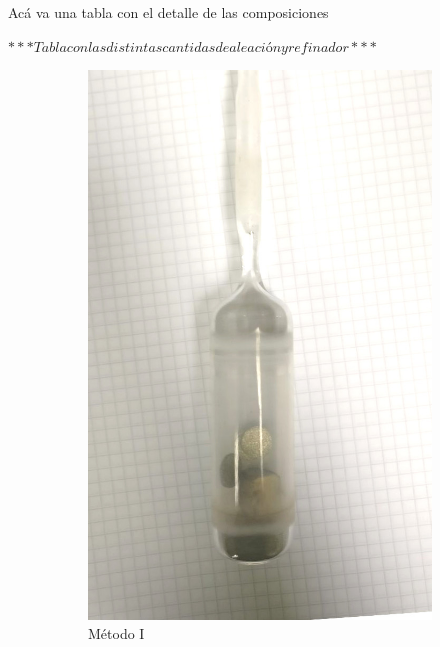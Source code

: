 \documentclass[a4paper,12pt,fleqn,twoside,openany]{book}
\begin{document}
Acá va una tabla con el detalle de las composiciones


$***Tabla con las distintas cantidas de aleación y refinador***$

 \begin{figure}[h]
    \centering
    \begin{subfigure}{0.2\textwidth}
        \includegraphics[width=\textwidth]{Img/Procedimiento/ampolla.jpg}
        \caption{Método I}
        \label{fig:ampolla}
    \end{subfigure}
    \begin{subfigure}{0.3\textwidth}

\end{subfigure}
\end{figure}
\end{document}
